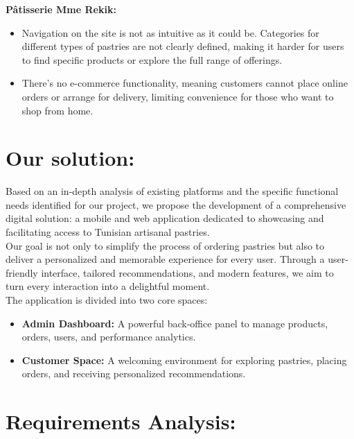 \textbf{Pâtisserie Mme Rekik:}\\

\begin{itemize}[label=\textbullet]
    \item Navigation on the site is not as intuitive as it could be. Categories for different types of pastries are not clearly defined, making it harder for users to find specific products or explore the full range of offerings.
    \item There’s no e-commerce functionality, meaning customers cannot place online orders or arrange for delivery, limiting convenience for those who want to shop from home.
\end{itemize}

\section{Our solution:}

Based on an in-depth analysis of existing platforms and the specific functional needs identified for our project, we propose the development of a comprehensive digital solution: a mobile and web application dedicated to showcasing and facilitating access to Tunisian artisanal pastries.\\

Our goal is not only to simplify the process of ordering pastries but also to deliver a personalized and memorable experience for every user. Through a user-friendly interface, tailored recommendations, and modern features, we aim to turn every interaction into a delightful moment.\\

The application is divided into two core spaces:\\

\begin{itemize}[label=\textbullet]
    \item \textbf{Admin Dashboard:} A powerful back-office panel to manage products, orders, users, and performance analytics.
    \item \textbf{Customer Space:} A welcoming environment for exploring pastries, placing orders, and receiving personalized recommendations.
\end{itemize}


\section{Requirements Analysis:}

